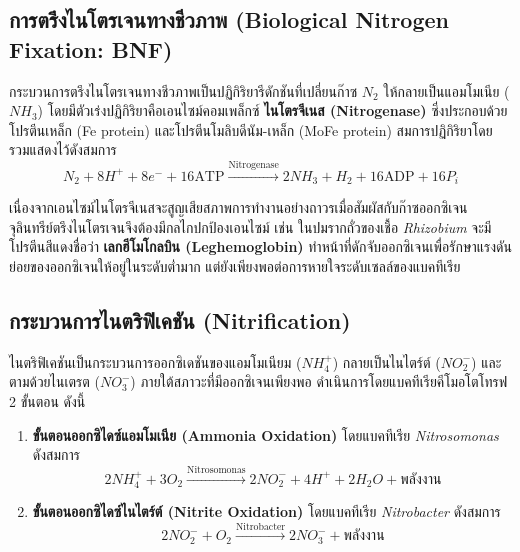 \subsection{การตรึงไนโตรเจนทางชีวภาพ (Biological Nitrogen Fixation: BNF)}
กระบวนการตรึงไนโตรเจนทางชีวภาพเป็นปฏิกิริยารีดักชันที่เปลี่ยนก๊าซ $N_2$ ให้กลายเป็นแอมโมเนีย ($NH_3$) โดยมีตัวเร่งปฏิกิริยาคือเอนไซม์คอมเพล็กซ์ \textbf{ไนโตรจีเนส (Nitrogenase)} ซึ่งประกอบด้วยโปรตีนเหล็ก (Fe protein) และโปรตีนโมลิบดีนัม-เหล็ก (MoFe protein) สมการปฏิกิริยาโดยรวมแสดงไว้ดังสมการ
\begin{equation}
N_2 + 8H^+ + 8e^- + 16\text{ATP} \xrightarrow{\text{Nitrogenase}} 2NH_3 + H_2 + 16\text{ADP} + 16P_i
\end{equation}

เนื่องจากเอนไซม์ไนโตรจีเนสจะสูญเสียสภาพการทำงานอย่างถาวรเมื่อสัมผัสกับก๊าซออกซิเจน จุลินทรีย์ตรึงไนโตรเจนจึงต้องมีกลไกปกป้องเอนไซม์ เช่น ในปมรากถั่วของเชื้อ \textit{Rhizobium} จะมีโปรตีนสีแดงชื่อว่า \textbf{เลกฮีโมโกลบิน (Leghemoglobin)} ทำหน้าที่ดักจับออกซิเจนเพื่อรักษาแรงดันย่อยของออกซิเจนให้อยู่ในระดับต่ำมาก แต่ยังเพียงพอต่อการหายใจระดับเซลล์ของแบคทีเรีย

\subsection{กระบวนการไนตริฟิเคชัน (Nitrification)}
ไนตริฟิเคชันเป็นกระบวนการออกซิเดชันของแอมโมเนียม ($NH_4^+$) กลายเป็นไนไตร์ต์ ($NO_2^-$) และตามด้วยไนเตรต ($NO_3^-$) ภายใต้สภาวะที่มีออกซิเจนเพียงพอ ดำเนินการโดยแบคทีเรียคีโมอโตโทรฟ 2 ขั้นตอน ดังนี้
\begin{enumerate}
    \item \textbf{ขั้นตอนออกซิไดซ์แอมโมเนีย (Ammonia Oxidation)} โดยแบคทีเรีย \textit{Nitrosomonas} ดังสมการ
    \begin{equation}
    2NH_4^+ + 3O_2 \xrightarrow{\text{Nitrosomonas}} 2NO_2^- + 4H^+ + 2H_2O + \text{พลังงาน}
    \end{equation}
    \item \textbf{ขั้นตอนออกซิไดซ์ไนไตร์ต์ (Nitrite Oxidation)} โดยแบคทีเรีย \textit{Nitrobacter} ดังสมการ
    \begin{equation}
    2NO_2^- + O_2 \xrightarrow{\text{Nitrobacter}} 2NO_3^- + \text{พลังงาน}
    \end{equation}
\end{enumerate}

